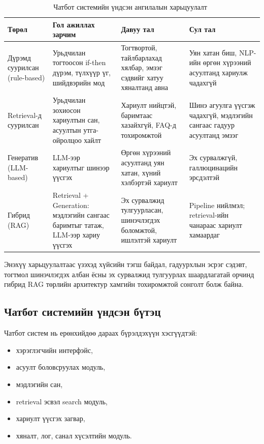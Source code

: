 \begin{center}
\begin{table}[!htbp]
\begin{tabular}{|p{2.3cm}|p{3.8cm}|p{3.7cm}|p{3.8cm}|}
\hline
\textbf{Төрөл} & \textbf{Гол ажиллах зарчим} & \textbf{Давуу тал} & \textbf{Сул тал} \\ \hline
Дүрэмд суурилсан (rule-based) & Урьдчилан тогтоосон if-then дүрэм, түлхүүр үг, шийдвэрийн мод & Тогтвортой, тайлбарлахад хялбар, эмзэг сэдвийг хатуу хяналтанд авна & Уян хатан биш, NLP-ийн өргөн хүрээний асуултанд хариулж чадахгүй \\ \hline
Retrieval-д суурилсан & Урьдчилан зохиосон хариултын сан, асуултын утга-ойролцоо хайлт & Хариулт нийцтэй, баримтаас хазайхгүй, FAQ-д тохиромжтой & Шинэ агуулга үүсгэж чадахгүй, мэдлэгийн сангаас гадуур асуултанд эмзэг \\ \hline
Генератив (LLM-based) & LLM-ээр хариултыг шинээр үүсгэх~\cite{vaswani2017,gpt3} & Өргөн хүрээний асуултанд уян хатан, хүний хэлбэртэй хариулт & Эх сурвалжгүй, галлюцинацийн эрсдэлтэй~\cite{llm_limitations,hallucination_survey} \\ \hline
Гибрид (RAG) & Retrieval + Generation: мэдлэгийн сангаас баримтыг татаж, LLM-ээр хариу үүсгэх~\cite{rag_survey,grounded_generation} & Эх сурвалжид тулгуурласан, шинэчлэгдэх боломжтой, ишлэлтэй хариулт & Pipeline нийлмэл; retrieval-ийн чанараас хариулт хамаардаг \\ \hline
\end{tabular}
\caption[Чатбот системийн ангилалын харьцуулалт]{Чатбот системийн үндсэн ангилалын харьцуулалт~\cite{chatbot_review}}
\label{tab:chatbot-types}
\end{table}
\end{center}

Энэхүү харьцуулалтаас үзэхэд хүйсийн тэгш байдал, гадуурхлын эсрэг сэдэвт, тогтмол шинэчлэгдэх албан ёсны эх сурвалжид тулгуурлах шаардлагатай орчинд гибрид RAG төрлийн архитектур хамгийн тохиромжтой сонголт болж байна.

\subsection{Чатбот системийн үндсэн бүтэц}

Чатбот систем нь ерөнхийдөө дараах бүрэлдэхүүн хэсгүүдтэй:
\begin{itemize}
    \item хэрэглэгчийн интерфэйс,
    \item асуулт боловсруулах модуль,
    \item мэдлэгийн сан,
    \item retrieval эсвэл search модуль,
    \item хариулт үүсгэх загвар,
    \item хяналт, лог, санал хүсэлтийн модуль.
\end{itemize}

